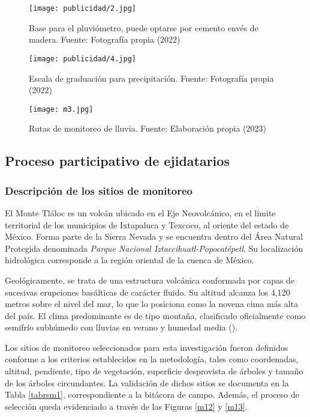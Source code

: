 \begin{figure}[h!]
\centering
  \texttt{[image: publicidad/2.jpg]}
  \caption{Base para el pluviómetro, puede optarse por cemento envés de madera. Fuente: Fotografía propia (2022)}
  \label{publicidad2}
\end{figure}
\begin{figure}[h!]
\centering
  \texttt{[image: publicidad/4.jpg]}
  \caption{Escala de graduación para precipitación. Fuente: Fotografía propia (2022)}
		\label{publicidad4}
\end{figure}
\begin{figure}[h!]
\centering
  \texttt{[image: m3.jpg]}
  \caption{Rutas de monitoreo de lluvia.  Fuente: Elaboración propia (2023)}
  \label{m3}
\end{figure}



  \subsection{Proceso participativo de ejidatarios}
\subsubsection{Descripción de los sitios de monitoreo}

El Monte Tláloc es un volcán ubicado en el Eje Neovolcánico, en el límite territorial de los municipios de Ixtapaluca y Texcoco, al oriente del estado de México. Forma parte de la Sierra Nevada y se encuentra dentro del Área Natural Protegida denominada \textit{Parque Nacional Iztaccíhuatl-Popocatépetl}. Su localización hidrológica corresponde a la región oriental de la cuenca de México.

Geológicamente, se trata de una estructura volcánica conformada por capas de sucesivas erupciones basálticas de carácter fluido. Su altitud alcanza los 4,120 metros sobre el nivel del mar, lo que lo posiciona como la novena cima más alta del país. El clima predominante es de tipo montaña, clasificado oficialmente como semifrío subhúmedo con lluvias en verano y humedad media (\cite{inegi_texcoco}).

Los sitios de monitoreo seleccionados para esta investigación fueron definidos conforme a los criterios establecidos en la metodología, tales como coordenadas, altitud, pendiente, tipo de vegetación, superficie desprovista de árboles y tamaño de los árboles circundantes. La validación de dichos sitios se documenta en la Tabla \ref{tabrsm1}, correspondiente a la bitácora de campo. Además, el proceso de selección queda evidenciado a través de las Figuras \ref{m12} y \ref{m13}.


